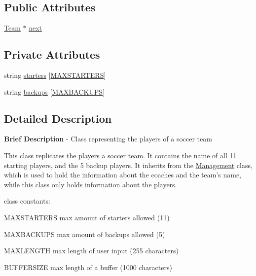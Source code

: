 \subsection*{Public Attributes}
\begin{DoxyCompactItemize}
\item 
\hyperlink{class_team}{Team} $\ast$ \hyperlink{class_team_a1d82260b41ee7610a0e36210825a53ea}{next}
\end{DoxyCompactItemize}
\subsection*{Private Attributes}
\begin{DoxyCompactItemize}
\item 
string \hyperlink{class_team_ac3a41d0b7f4013c8643529062bf2c239}{starters} \mbox{[}\hyperlink{_management_8h_a8ad0c96529f809b83cae71c128d9e7af}{M\-A\-X\-S\-T\-A\-R\-T\-E\-R\-S}\mbox{]}
\item 
string \hyperlink{class_team_ad1ef40efc4c39fe0cc34784b872054f7}{backups} \mbox{[}\hyperlink{_management_8h_a14d22215d85e80ff360b526bd4025785}{M\-A\-X\-B\-A\-C\-K\-U\-P\-S}\mbox{]}
\end{DoxyCompactItemize}


\subsection{Detailed Description}
{\bfseries Brief Description} -\/ Class representing the players of a soccer team 

This class replicates the players a soccer team. It contains the name of all 11 starting players, and the 5 backup players. It inherits from the \hyperlink{class_management}{Management} class, which is used to hold the information about the coaches and the team's name, while this class only holds information about the players.


\begin{DoxyItemize}
\item class constants\-:
\begin{DoxyItemize}
\item M\-A\-X\-S\-T\-A\-R\-T\-E\-R\-S max amount of starters allowed (11)
\item M\-A\-X\-B\-A\-C\-K\-U\-P\-S max amount of backups allowed (5)
\item M\-A\-X\-L\-E\-N\-G\-T\-H max length of user input (255 characters)
\item B\-U\-F\-F\-E\-R\-S\-I\-Z\-E max length of a buffer (1000 characters)
\end{DoxyItemize}
\end{DoxyItemize}



